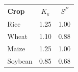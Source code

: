 \begin{tabular}{lcc}
\toprule
Crop & $K_y$ & $S^{P}$\\
\midrule
Rice & 1.25 & 1.00 \\
Wheat & 1.10 & 0.88 \\
Maize & 1.25 & 1.00 \\
Soybean & 0.85 & 0.68 \\
\bottomrule
\end{tabular}
